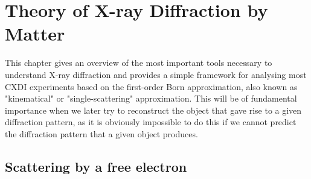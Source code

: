\chapter{Theory of X-ray Diffraction by Matter}\label{diffraction_theory}\noindent

This chapter gives an overview of the most important tools necessary to
understand X-ray diffraction and provides a simple framework for analysing most
CXDI experiments based on the first-order Born approximation, also known as
"kinematical" or "single-scattering" approximation. This will be of fundamental
importance when we later try to reconstruct the object that gave rise to a given
diffraction pattern, as  it is obviously impossible to do this if we cannot
predict the diffraction pattern that a given object produces.

\section{Scattering by a free electron}\label{diffraction_physics}

